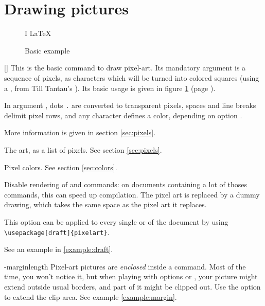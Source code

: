 \documentclass[
  load-preamble-,
  babel-options=english,
  add-index=true,
]{cnltx-doc}
\begin{document}
\section{Drawing pictures}

  \begin{figure}
  \begin{sidebyside}
    I  \LaTeX
  \end{sidebyside}
  \caption{Basic example}
  \label{fig:basic}
\end{figure}

\begin{commands}
  []
  This is the basic command to draw pixel-art. Its mandatory argument is a sequence of pixels, as characters which will be turned into colored squares (using a , from Till Tantau's ). Its basic usage is given in figure \ref{fig:basic} (page \pageref{fig:basic}).

  In argument , dots \texttt{.} are converted to transparent pixels, spaces and line breaks delimit pixel rows, and any character defines a color, depending on option .

  More information is given in section \ref{sec:pixels}.

  \begin{options}
     The art, as a list of pixels. See section \ref{sec:pixels}.

     Pixel colors. See section \ref{sec:colors}.

    \label{option:draft} Disable rendering of  and  commands: on documents containing a lot of thoses commands, this can speed up compilation. The pixel art is replaced by a dummy drawing, which takes the same space as the pixel art it replaces.

    This option can be applied to every single  or  of the document by using \verb+\usepackage[draft]{pixelart}+.

    See an example in \ref{example:draft}.

    \keyval-{margin}{length} Pixel-art pictures are \emph{enclosed} inside a   command. Most of the time, you won't notice it, but when playing with options  or , your picture might extend outside usual borders, and part of it might be clipped out. Use the  option to extend the clip area. See example \ref{example:margin}.


\end{options}
\end{commands}
\end{document}
